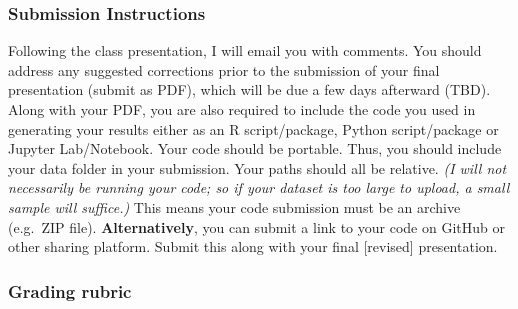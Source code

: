 \documentclass[11pt,twoside]{article}
\makeatletter
\newenvironment{exercise}{\@startsection 
	{section}
	{1}
	{-.2em}
	{-3.5ex plus -1ex minus -.2ex}
    	{1.3ex plus .2ex}
    	{\pagebreak[3]%
	\large\bf\noindent{Part 1.\hspace{-1.5ex} }
	}
	}
\newcommand{\?}{\stackrel{?}{=}}
\makeatother
\begin{document}


\subsubsection*{Submission Instructions}
Following the class presentation, I will email you with comments.
You should address any suggested corrections prior to the submission of your final presentation (submit as PDF), which will be due a few days afterward (TBD).
Along with your PDF, you are also required to include the code you used in generating your results either as an R script/package, Python script/package or Jupyter Lab/Notebook.
Your code should be portable. Thus, you should include your data folder in your submission. Your paths should all be relative. \textit{(I will not necessarily be running your code; so if your dataset is too large to upload, a small sample will suffice.)}
This means your code submission must be an archive (e.g.\ ZIP file). \textbf{Alternatively}, you can submit a link to your code on GitHub or other sharing platform.
Submit this along with your final [revised] presentation.


\subsubsection*{Grading rubric}
\end{document}
